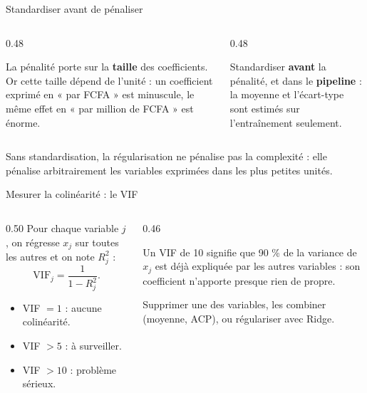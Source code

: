 \begin{frame}{Standardiser avant de pénaliser}
\begin{columns}[t]
\begin{column}{0.48\textwidth}
\begin{wbox}[Le problème]
La pénalité porte sur la \textbf{taille} des coefficients. Or cette taille dépend
de l'unité : un coefficient exprimé en « par FCFA » est minuscule, le même effet
en « par million de FCFA » est énorme.
\end{wbox}
\end{column}
\begin{column}{0.48\textwidth}
\begin{solbox}[La règle]
Standardiser \textbf{avant} la pénalité, et dans le \textbf{pipeline} : la
moyenne et l'écart-type sont estimés sur l'entraînement seulement.
\end{solbox}
\end{column}
\end{columns}
\vspace{2mm}
\begin{kbox}[Conséquence]
Sans standardisation, la régularisation ne pénalise pas la complexité : elle
pénalise arbitrairement les variables exprimées dans les plus petites unités.
\end{kbox}
\end{frame}

\begin{frame}{Mesurer la colinéarité : le VIF}
\begin{columns}[t]
\begin{column}{0.50\textwidth}
Pour chaque variable $j$, on régresse $x_j$ sur toutes les autres et on note
$R_j^2$ :
\[
  \mathrm{VIF}_j=\frac{1}{1-R_j^2}.
\]
\begin{itemize}
  \item VIF $=1$ : aucune colinéarité.
  \item VIF $>5$ : à surveiller.
  \item VIF $>10$ : problème sérieux.
\end{itemize}
\end{column}
\begin{column}{0.46\textwidth}
\begin{kbox}[Lecture]
Un VIF de 10 signifie que 90 \% de la variance de $x_j$ est déjà expliquée par
les autres variables : son coefficient n'apporte presque rien de propre.
\end{kbox}
\begin{wbox}[Remèdes]
Supprimer une des variables, les combiner (moyenne, ACP), ou régulariser avec
Ridge.
\end{wbox}
\end{column}
\end{columns}
\end{frame}


